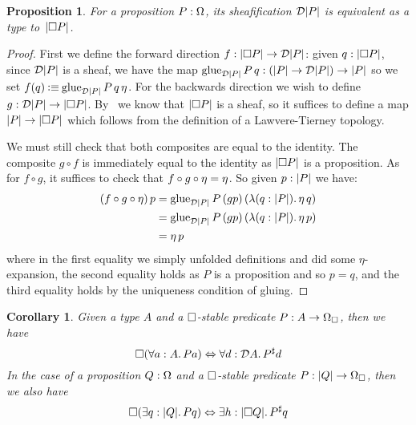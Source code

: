 \documentclass[11pt]{article}
\newtheorem{prop}[thrm]{Proposition}
\newtheorem{coro}[thrm]{Corollary}
\begin{document}
\begin{prop}
  For a proposition \(P : \Omega\), its sheafification \(\mathcal{D}{|{P}|}\)
  is equivalent as a type to~\(|{\Box{P}}|\).
\end{prop}
\begin{proof}
  First we define the forward direction
  \(f : |{\Box{P}}| \to \mathcal{D}{|{P}|}\):
  given \(q : |{\Box{P}}|\), since \(\mathcal{D}{|{P}|}\) is a sheaf,
  we have the map
  \(\text{glue}_{\mathcal{D}{|{P}|}}\,P\,q : (|{P}| \to \mathcal{D}{|{P}|}) \to |{P}|\)
  so we set
  \(f(q) \mathbin{\vcentcolon\equiv} \text{glue}_{\mathcal{D}{|{P}|}}\,P\,q\,\eta\).
  For the backwards direction we wish to define
  \(g : \mathcal{D}{|{P}|} \to |{\Box{P}}|\).
  By~ we know that \(|{\Box{P}}|\)
  is a sheaf, so it suffices to define a map
  \(|{P}| \to |{\Box{P}}|\) which follows from the
  definition of a Lawvere-Tierney topology.

  We must still check that both composites are equal to the identity.
  The composite \(g\circ f\) is immediately equal to the identity as
  \(|{\Box{P}}|\) is a proposition.
  As for \(f \circ g\), it suffices to check that
  \(f\circ g\circ \eta = \eta\).
  So given \(p : |{P}|\) we have:
  \begin{align*}
    (f \circ g \circ \eta)\,p
    &=
      \text{glue}_{\mathcal{D}{|{P}|}}\,P\,(gp)\,({\mathop{\lambda({q:|{P}|}).}{\eta\,{q}}})
    \\
    &=
      \text{glue}_{\mathcal{D}{|{P}|}}\,P\,(gp)\,({\mathop{\lambda({q:|{P}|}).}{\eta\,{p}}})
    \\
    &=
      \eta\,{p}
  \end{align*}
  where in the first equality we simply unfolded definitions and did some
  \(\eta\)-expansion, the second equality holds as \(P\) is a proposition and so
  \(p = q\), and the third equality holds by the uniqueness condition of gluing.
\end{proof}

\begin{coro}
  Given a type \(A\) and a \(\Box\)-stable predicate
  \(P:A\to\Omega_\Box\), then we have
  \[
    \Box{(\forall{a:A}.\,{Pa})}
    \Leftrightarrow
    \forall{d:\mathcal{D}{A}}.\,{{P}^\sharp d}
  \]
  In the case of a proposition \(Q:\Omega\) and
  a \(\Box\)-stable predicate \(P:|{Q}|\to\Omega_\Box\), then we also have
  \[
    \Box{(\exists{q:|{Q}|}.\,{Pq})}
    \Leftrightarrow
    \exists{h:|{\Box{Q}}|}.\,{{P}^\sharp q}
  \]
\end{coro}
\end{document}
